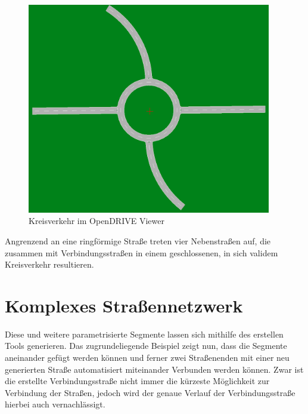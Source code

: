 \begin{figure}[H]
\flushleft
\includegraphics[width=0.95\textwidth]{fig/fig7.png}
\caption{Kreisverkehr im OpenDRIVE Viewer}
\label{abb6}
\end{figure}

Angrenzend an eine ringförmige Straße treten vier Nebenstraßen auf, die zusammen mit Verbindungsstraßen in einem geschlossenen, in sich validem Kreisverkehr resultieren.

\section{Komplexes Straßennetzwerk}

Diese und weitere parametrisierte Segmente lassen sich mithilfe des erstellen Tools generieren. Das zugrundeliegende Beispiel zeigt nun, dass die Segmente aneinander gefügt werden können und ferner zwei Straßenenden mit einer neu generierten Straße automatisiert miteinander Verbunden werden können. Zwar ist die erstellte Verbindungsstraße nicht immer die kürzeste Möglichkeit zur Verbindung der Straßen, jedoch wird der genaue Verlauf der Verbindungsstraße hierbei auch vernachlässigt.

